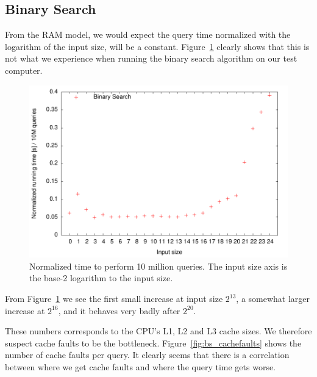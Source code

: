 \subsection{Binary Search}
From the RAM model, we would expect the query time normalized with the
logarithm of the input size, will be a
constant. Figure~\ref{fig:bs_runningtime} clearly shows that this is
not what we experience when running the binary search algorithm on our
test computer.

\begin{figure}[h!]
  \label{fig:bs_runningtime}
  \centering
  \includegraphics{../week1/plots/outputs/bs_runningtime}
  \caption{Normalized time to perform 10 million queries. The input
    size axis is the base-2 logarithm to the input size.}
\end{figure}

From Figure~\ref{fig:bs_runningtime} we see the first small increase
at input size \(2^{13}\), a somewhat larger increase at \(2^{16}\),
and it behaves very badly after \(2^{20}\).

These numbers corresponds to the CPU's L1, L2 and L3 cache sizes. We
therefore suspect cache faults to be the
bottleneck. Figure~\ref{fig:bs_cachefaults} shows the number of cache
faults per query. It clearly seems that there is a correlation between
where we get cache faults and where the query time gets worse.

